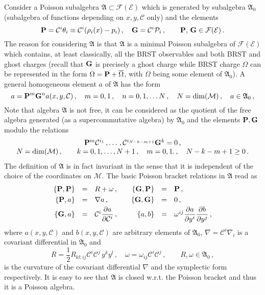 \documentclass[a4paper,11pt,oneside]{amsart}
\theoremstyle{plain}
\numberwithin{equation}{section} %
\numberwithin{figure}{section} %
\newcommand{\pb}[2]{\left\{{}#1{},{}#2{}\right\}}
\renewcommand{\dim}[1]{{\rm dim}(#1)}
\def\bar{\overline}
\def\d{\partial}
\newcommand{\ddl}[2]{\displaystyle\frac{{\d #1}}{\d #2}}
\def\cP{{\mathcal P}}
\def\cc{{\mathcal C}}
\newcommand{\formal}[1]{{{\mathcal F}}{(#1)}}             %
\def\manM{{\mathcal M}}
\def\aA{{ \mathfrak A}}
\def\E{{ \mathcal E}}
\def\P{{ \bf P}}
\def\G{{ \bf G}}
\begin{document}
\noindent
Consider a Poisson subalgebra $\aA \subset \formal{\E}$
which is generated by subalgebra $\aA_0$
(subalgebra of functions depending on $x,y,\cc$ only)
and the elements
\begin{equation}
\P=\cc^i\theta_i \equiv \cc^i(\rho_i(x)-p_i)\,,\quad
\G=\cc^i \cP_i\,, \qquad \P,\,\G\in\formal{\E}\,.
\end{equation}
The reason for considering $\aA$ is that $\aA$ is a minimal
Poisson subalgebra of $\formal{\E}$ which contains,
at least classically, all the BRST observables and
both BRST and ghost charges (recall that $\G$
is precisely a ghost charge while BRST charge $\Omega$
can be represented in the form $\Omega=\P+{\bar\Omega}$,
with $\bar\Omega$ being some element of $\aA_0$).  A
general homogeneous element $a$ of $\aA$ has the form
\begin{equation}
a=\P^m
\G^n a(x,y,\cc)\,, \quad m=0,1\,,\quad n=0,1,\ldots N\,,\quad
N=\dim{\manM}\,, \quad a\in \aA_0\,,
\end{equation}
Note that algebra $\aA$ is not free, it can be considered
as the quotient of the free algebra generated (as a supercommutative
algebra) by $\aA_0$ and the elements $\P,\G$ modulo the relations
\begin{equation}
\begin{array}{c}
\P^m \cc^{i_1}\,,\ldots\,,\cc^{i_{N-k-m+1}} \G^k=0\,, \\
N=\dim{\manM}\,,\qquad k=0,1,\ldots,N+1\,,\quad m=0,1.\,,\quad N-k-m+1
\geq 0\,.
\end{array}
\end{equation}
The definition of $\aA$ is in fact invariant in
the sense that it is independent of the choice of
the coordinates on $\manM$.  The basic Poisson
bracket relations in $\aA$ read as
\begin{equation}
\begin{array}{rclrcl}
\displaystyle
\pb{\P}{\P}&=&R+\omega\,, \quad &
\pb{\G}{\P}&=&\P\,, \\[3pt]
\pb{\P}{a}&=&\nabla a\,, \quad &
\pb{\G}{\G}&=&0 \,,\\[3pt]
\pb{\G}{a}&=&\cc^i\ddl{a}{\cc^i}\,, \quad &
\pb{a}{b}&=&\omega^{ij}\ddl{a}{y^i}\ddl{b}{y^j}\,,\\
\end{array}
\end{equation}
where $a(x,y,\cc)$ and $b(x,y,\cc)$ are arbitrary elements of $\aA_0$,
$\nabla=\cc^i\nabla_i$ is a covariant differential in $\aA_0$
and
\begin{equation}
R=\frac{1}{2} R_{kl;ij} \cc^i \cc^j \,y^k y^l\,, \quad
\omega=\omega_{ij} \cc^i \cc^j \,, \qquad R,\omega \in \aA_0\,,
\end{equation}
is the curvature of the covariant differential $\nabla$
and the symplectic form respectively.  It is
easy to see that $\aA$ is closed w.r.t. the Poisson
bracket and thus it is a Poisson algebra.
\end{document}
